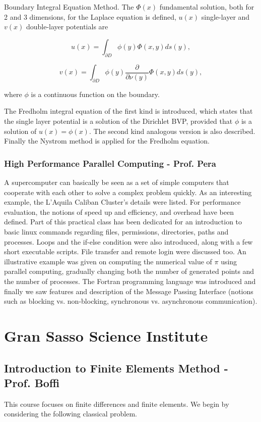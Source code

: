 \documentclass{article}
\begin{document}
\begin{outline}[enumerate]
\1 Boundary Integral Equation Method. The $\Phi (x)$ fundamental solution, both for 2 and 3 dimensions, for the Laplace equation is defined, $u(x)$ single-layer and $v(x)$ double-layer potentials are

\[ u(x) = \int_{\partial D} \phi(y) \Phi(x,y) ds(y),\]

\[ v(x) = \int_{\partial D} \phi(y) \frac{\partial}{\partial \nu(y)}\Phi(x,y) ds(y),\]

where $\phi$ is a continuous function on the boundary.

The Fredholm integral equation of the first kind is introduced, which states that the single layer potential is a solution of the Dirichlet BVP, provided that $\phi$ is a solution of $u(x) = \phi (x). $ The second kind analogous version is also described. Finally the Nystrom method is applied for the Fredholm equation.

\end{outline}

\subsubsection{High Performance Parallel Computing - Prof. Pera}

A supercomputer can basically be seen as a set of simple computers that cooperate with each other to solve a complex problem quickly. As an interesting example, the L'Aquila Caliban Cluster's details were listed. For performance evaluation, the notions of speed up and efficiency, and overhead have been defined.
Part of this practical class has been dedicated for an introduction to basic linux commands regarding files, permissions, directories, paths and processes. Loops and the if-else condition were also introduced, along with a few short executable scripts. File transfer and remote login were discussed too.
An illustrative example was given on computing the numerical value of $\pi$ using parallel computing, gradually changing both the number of generated points and the number of processes.
The Fortran programming language was introduced and finally we saw features and description of the Message Passing Interface (notions such as blocking vs. non-blocking, synchronous vs. asynchronous communication).

\section{Gran Sasso Science Institute}

\subsection{Introduction to Finite Elements Method - Prof. Boffi}
This course focuses on finite differences and finite elements. We begin by considering the following classical problem.
\end{document}
